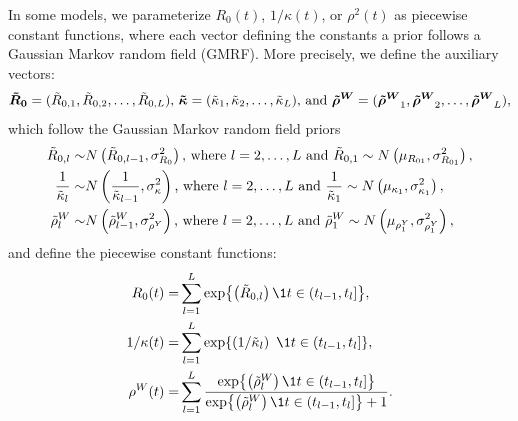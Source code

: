 In some models, we parameterize \( R_0(t) \), \( 1 / \kappa(t) \), or \( \rho^2(t) \) as piecewise constant functions, where each vector defining the constants a prior follows a Gaussian Markov random field (GMRF).
More precisely, we define the auxiliary vectors:
\begin{gather*}
\boldsymbol{\tilde{R}_0} = (\tilde{R}_{0,1}, \tilde{R}_{0,2}, \ldots, \tilde{R}_{0,L}) \text{, }
\boldsymbol{\tilde{\kappa}} = (\tilde{\kappa}_1, \tilde{\kappa}_2, \ldots, \tilde{\kappa}_L)  \text{, and }
\boldsymbol{\tilde{\rho}^W} = (\boldsymbol{\tilde{\rho}^W}_1, \boldsymbol{\tilde{\rho}^W}_2, \ldots, \boldsymbol{\tilde{\rho}^W}_L),
\end{gather*}
which follow the Gaussian Markov random field priors
\begin{equation}
\begin{aligned}
	\tilde{R}_{0,l} \sim& N\left(\tilde{R}_{0, l - 1}, \sigma_{R_0}^2\right)\text{, where } l=2,\ldots,L \text{ and } \tilde{R}_{0,1} \sim N\left(\mu_{R_{01}},\sigma^2_{R_{01}}\right),\\
	\frac{1}{\tilde{\kappa}_{l}} \sim& N\left(\frac{1}{\tilde{\kappa}_{l - 1}}, \sigma_\kappa^2\right)\text{, where } l=2,\ldots,L \text{ and } \frac{1}{\tilde{\kappa}_1} \sim N\left(\mu_{\kappa_1},\sigma^2_{\kappa_1}\right),\\
	\tilde{\rho}^W_{l} \sim& N\left(\tilde{\rho}^W_{l - 1}, \sigma_{\rho^Y}^2\right)\text{, where } l=2,\ldots,L \text{ and } \tilde{\rho}^W_1 \sim N\left(\mu_{\rho^Y_1}, \sigma^2_{\rho^Y_1}\right),
 \label{ch_4:eqn:GMRF}
\end{aligned}
\end{equation}
and define the piecewise constant functions:
\begin{align}
	R_0(t) =& \sum_{l=1}^L \exp{\left( \tilde{R}_{0,l} \right) \1{t \in (t_{l-1}, t_l]}},\\
	1 / \kappa(t) =& \sum_{l=1}^L \exp{\left( 1 / \kappatilde_l \right)\ \1{t \in (t_{l-1}, t_l]} },\\
	\rho^W(t) =& \sum_{l=1}^L \frac{\exp{\left( \rhowtilde_l \right) \1{t \in (t_{l-1}, t_l]} }}{\exp{\left( \rhowtilde_l \right) \1{t \in (t_{l-1}, t_l]} } + 1}.
\end{align}

